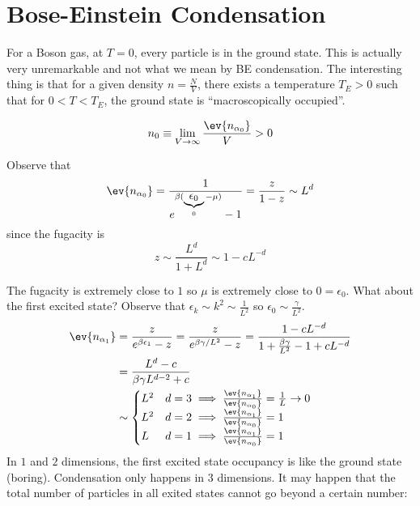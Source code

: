 \documentclass[a4paper,twoside,master.tex]{subfiles}
\begin{document}

\section{Bose-Einstein Condensation}
\label{sec:bose-einstein_condensation}

For a Boson gas, at $ T = 0 $, every particle is in the ground state. This is actually very unremarkable and not what we mean by BE condensation. The interesting thing is that for a given density $ n = \frac{N}{V} $, there exists a temperature $ T_E > 0 $ such that for $ 0 < T < T_E $, the ground state is ``macroscopically occupied''.

\begin{equation}
    n_0 \equiv \lim_{V \to \infty} \frac{\ev{n_{\alpha_0}}}{V} > 0
\end{equation}

Observe that
\begin{equation}
    \ev{n_{\alpha_0}} = \frac{1}{e^{\beta (\underbrace{\epsilon_0}_{0} - \mu)} - 1} = \frac{z}{1-z} \sim L^d
\end{equation}
since the fugacity is
\begin{equation}
    z \sim \frac{L^d}{1 + L^d} \sim 1 - cL^{-d}
\end{equation}

The fugacity is extremely close to $ 1 $ so $ \mu $ is extremely close to $ 0 = \epsilon_0 $. What about the first excited state? Observe that $ \epsilon_k \sim k^2 \sim \frac{1}{L^2} $ so $ \epsilon_0 \sim \frac{\gamma}{L^2} $.
\begin{align}
    \ev{n_{\alpha_1}} &= \frac{z}{e^{\beta \epsilon_1} - z} = \frac{z}{e^{\beta \gamma / L^2} - z} = \frac{1 - cL^{-d}}{1 + \frac{\beta \gamma}{L^2} - 1 + cL^{-d}} \\
    &= \frac{L^d - c}{\beta \gamma L^{d-2} + c} \\
    & \sim \begin{cases} L^2 & d=3 \implies \frac{\ev{n_{\alpha_1}}}{\ev{n_{\alpha_0}}} = \frac{1}{L} \to 0 \\ L^2 & d=2 \implies \frac{\ev{n_{\alpha_1}}}{\ev{n_{\alpha_0}}} = 1\\ L & d=1 \implies \frac{\ev{n_{\alpha_1}}}{\ev{n_{\alpha_0}}} = 1\end{cases}
\end{align}
In $ 1 $ and $ 2 $ dimensions, the first excited state occupancy is like the ground state (boring). Condensation only happens in $ 3 $ dimensions. It may happen that the total number of particles in all exited states cannot go beyond a certain number:
\end{document}
